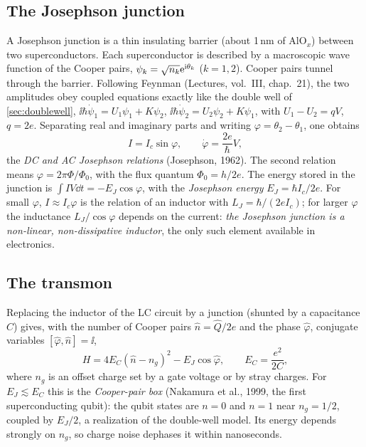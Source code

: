 \subsection{The Josephson junction}
\begin{origin}
A Josephson junction is a thin insulating barrier (about 1\,nm of AlO$_x$) between two superconductors. Each superconductor is described by a macroscopic wave function of the Cooper pairs, $\psi_k=\sqrt{n_k}\mathrm e^{\mathrm i\theta_k}$ ($k=1,2$).
Cooper pairs tunnel through the barrier. Following Feynman (Lectures, vol.~III, chap.~21), the two amplitudes obey coupled equations exactly like the double well of \cref{sec:doublewell},
$\ii\hbar\dot\psi_1=U_1\psi_1+K\psi_2$, $\ii\hbar\dot\psi_2=U_2\psi_2+K\psi_1$, with $U_1-U_2=qV$, $q=2e$. Separating real and imaginary parts and writing $\varphi=\theta_2-\theta_1$, one obtains
\begin{equation}
  I=I_c\sin\varphi,\qquad\dot\varphi=\frac{2e}\hbar V,
\end{equation}
the \emph{DC and AC Josephson relations} (Josephson, 1962). The second relation means $\varphi=2\pi\Phi/\Phi_0$, with the flux quantum $\Phi_0=h/2e$. The energy stored in the junction is $\int IV\dd t=-E_J\cos\varphi$, with the
\emph{Josephson energy} $E_J=\hbar I_c/2e$. For small $\varphi$, $I\approx I_c\varphi$ is the relation of an inductor with $L_J=\hbar/(2eI_c)$; for larger $\varphi$ the inductance $L_J/\cos\varphi$ depends on the current:
\emph{the Josephson junction is a non-linear, non-dissipative inductor}, the only such element available in electronics.
\end{origin}

\subsection{The transmon}
Replacing the inductor of the LC circuit by a junction (shunted by a capacitance $C$) gives, with the number of Cooper pairs $\hat n=\hat Q/2e$ and the phase $\hat\varphi$, conjugate variables $[\hat\varphi,\hat n]=\ii$,
\begin{equation}\label{eq:transmon}
  H=4E_C(\hat n-n_g)^2-E_J\cos\hat\varphi,\qquad E_C=\frac{e^2}{2C},
\end{equation}
where $n_g$ is an offset charge set by a gate voltage or by stray charges. For $E_J\lesssim E_C$ this is the \emph{Cooper-pair box} (Nakamura et al., 1999, the first superconducting qubit): the qubit states are $n=0$ and $n=1$ near $n_g=1/2$,
coupled by $E_J/2$, a realization of the double-well model. Its energy depends strongly on $n_g$, so charge noise dephases it within nanoseconds.

